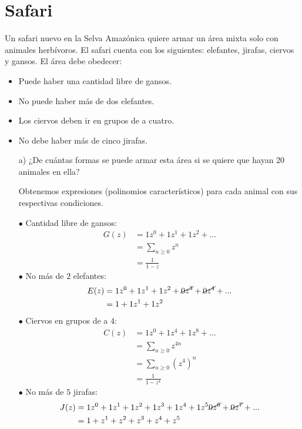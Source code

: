 \documentclass[spanish, fleqn]{article}
\begin{document}
	\section{Safari}
	Un safari nuevo en la Selva Amazónica quiere armar un área mixta solo con animales herbívoros. El safari cuenta con los siguientes: elefantes, jirafas, ciervos y gansos. El área debe obedecer:
    \begin{itemize}
    \item Puede haber una cantidad libre de gansos.
    \item No puede haber más de dos elefantes.
    \item Los ciervos deben ir en grupos de a cuatro.
    \item No debe haber más de cinco jirafas.
    \end{itemize}
    \begin{enumerate}
    \item[a)] ¿De cuántas formas se puede armar esta área si se quiere que hayan 20 animales en ella?
    
    Obtenemos expresiones (polinomios característicos) para cada animal con sus respectivas condiciones.
    
    $\bullet$ Cantidad libre de gansos:
    \begin{align*}
        G(z) &= 1z^0 + 1z^1 + 1z^2 + ...\\
        &= \sum_{n\geqslant0} z^n \\
        &= \frac{1}{1-z} 
    \end{align*}
    $\bullet$ No más de $2$ elefantes:
    \begin{align*}
        E(z) &= 1z^0 + 1z^1 + 1z^2 + \cancel{0z^3} + \cancel{0z^4} + ...\\
        &= 1 + 1z^1 + 1z^2
    \end{align*}
    $\bullet$ Ciervos en grupos de a $4$:
    \begin{align*}
        C(z) &= 1z^0 + 1z^4 + 1z^8 + ...\\
        &= \sum_{n\geqslant0} z^{4n} \\
        &= \sum_{n\geqslant0} (z^{4})^n\\
        &= \frac{1}{1-z^4}
    \end{align*}
    $\bullet$ No más de $5$ jirafas:
    \begin{align*}
        J(z) &= 1z^0 + 1z^1 + 1z^2 + 1z^3 + 1z^4 + 1z^5 \cancel{0z^6} + \cancel{0z^7} + ...\\
        &= 1 + z^1 + z^2 + z^3 + z^4 + z^5
    \end{align*}
    

\end{enumerate}
\end{document}
